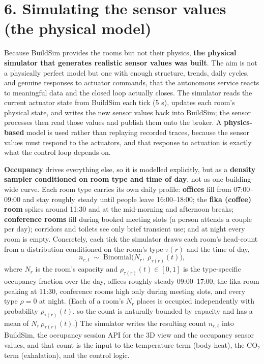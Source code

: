 \documentclass[
  11pt,
]{article}
\begin{document}
\hypertarget{simulating-the-sensor-values-the-physical-model}{%
\section{6. Simulating the sensor values (the physical
model)}\label{simulating-the-sensor-values-the-physical-model}}

Because BuildSim provides the rooms but not their physics, \textbf{the physical simulator that generates realistic sensor values was built}.
The aim is not a physically perfect model but one with enough structure, trends, daily cycles, and genuine responses to actuator commands, that the autonomous service reacts to meaningful data and the closed
loop actually closes. The simulator reads the current actuator state
from BuildSim each tick (5 s), updates each room's physical state, and
writes the new sensor values back into BuildSim; the sensor processes
then read those values and publish them onto the broker. A \textbf{physics-based} model is used rather than replaying recorded traces,
because the sensor values must respond to the actuators, and that
response to actuation is exactly what the control loop depends on.

\textbf{Occupancy} drives everything else, so it is modelled explicitly, but as a \textbf{density sampler conditioned on room type and time of
day}, not as one building-wide curve. Each room type carries its own
daily profile: \textbf{offices} fill from 07:00--09:00 and stay roughly
steady until people leave 16:00--18:00; the \textbf{fika (coffee) room}
spikes around 11:30 and at the mid-morning and afternoon breaks;
\textbf{conference rooms} fill during booked meeting slots (a person
attends a couple per day); corridors and toilets see only brief
transient use; and at night every room is empty. Concretely, each tick
the simulator draws each room's head-count from a distribution
conditioned on the room's type \(\tau(r)\) and the time of day,
\[
  n_{r,t}\;\sim\;\mathrm{Binomial}\!\big(N_r,\;\rho_{\tau(r)}(t)\big),
\]
where \(N_r\) is the room's capacity and \(\rho_{\tau(r)}(t)\in[0,1]\) is
the type-specific occupancy fraction over the day, offices roughly
steady 09:00--17:00, the fika room peaking at 11:30, conference rooms
high only during meeting slots, and every type \(\rho=0\) at night. (Each
of a room's \(N_r\) places is occupied independently with probability
\(\rho_{\tau(r)}(t)\), so the count is naturally bounded by capacity and
has a mean of \(N_r\,\rho_{\tau(r)}(t)\).) The simulator writes the
resulting count \(n_{r,t}\) into BuildSim, the occupancy session API
for the 3D view and the occupancy sensor values, and that count is the
input to the temperature term (body heat), the CO₂ term (exhalation), and
the control logic.
\end{document}
